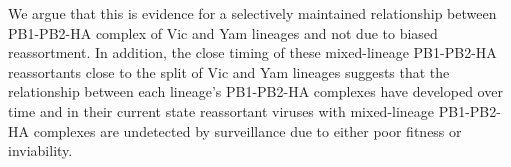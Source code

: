 \documentclass[11pt,oneside,letterpaper]{article}
\begin{document}
We argue that this is evidence for a selectively maintained relationship between PB1-PB2-HA complex of Vic and Yam lineages and not due to biased reassortment.
In addition, the close timing of these mixed-lineage PB1-PB2-HA reassortants close to the split of Vic and Yam lineages suggests that the relationship between each lineage's PB1-PB2-HA complexes have developed over time and in their current state reassortant viruses with mixed-lineage PB1-PB2-HA complexes are undetected by surveillance due to either poor fitness or inviability.







\end{document}
